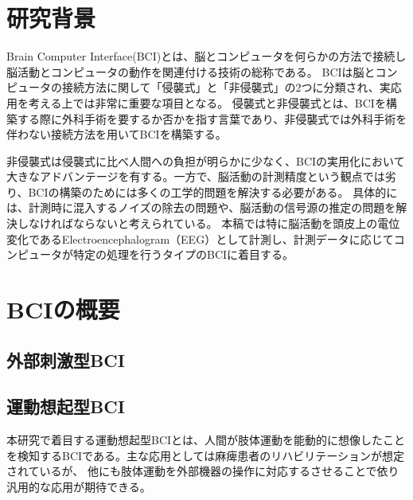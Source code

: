 \section{研究背景}

Brain Computer Interface(BCI)とは、脳とコンピュータを何らかの方法で接続し脳活動とコンピュータの動作を関連付ける技術の総称である。
BCIは脳とコンピュータの接続方法に関して「侵襲式」と「非侵襲式」の2つに分類され、実応用を考える上では非常に重要な項目となる。
侵襲式と非侵襲式とは、BCIを構築する際に外科手術を要するか否かを指す言葉であり、非侵襲式では外科手術を伴わない接続方法を用いてBCIを構築する。

非侵襲式は侵襲式に比べ人間への負担が明らかに少なく、BCIの実用化において大きなアドバンテージを有する。一方で、脳活動の計測精度という観点では劣り、BCIの構築のためには多くの工学的問題を解決する必要がある。
具体的には、計測時に混入するノイズの除去の問題や、脳活動の信号源の推定の問題を解決しなければならないと考えられている。
本稿では特に脳活動を頭皮上の電位変化であるElectroencephalogram（EEG）として計測し、計測データに応じてコンピュータが特定の処理を行うタイプのBCIに着目する。


\section{BCIの概要}
\subsection{外部刺激型BCI}
\subsection{運動想起型BCI}
本研究で着目する運動想起型BCIとは、人間が肢体運動を能動的に想像したことを検知するBCIである。主な応用としては麻痺患者のリハビリテーションが想定されているが、
他にも肢体運動を外部機器の操作に対応するさせることで依り汎用的な応用が期待できる。

